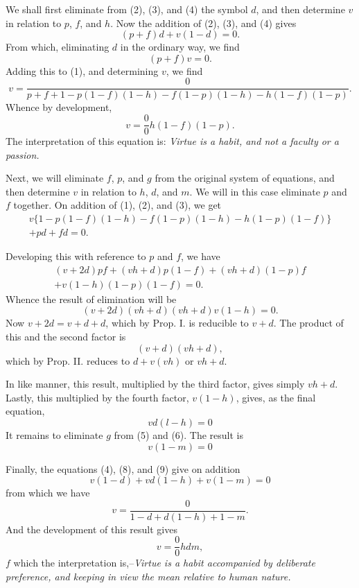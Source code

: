 \documentclass[oneside]{book}
\begin{document}
We shall first eliminate from (2), (3), and (4) the symbol $d$, and
then determine $v$ in relation to $p$, $f$, and $h$. Now the addition of
(2), (3), and (4) gives
\[
\left(p+f\right)d+v\left(1-d\right)=0.
\]
From which, eliminating $d$ in the ordinary way, we find
\begin{equation}
\left(p+f\right)v=0.
\end{equation}
Adding this to (1), and determining $v$, we find
\[
v=\frac{0}{p+f+1-p\left(1-f\right)\left(1-h\right)-f\left(1-p\right)\left(1-h\right)-h\left(1-f\right)\left(1-p\right)}.
\]
Whence by development,
\[
v=\frac{0}{0}h\left(1-f\right)\left(1-p\right).
\]
The interpretation of this equation is: \textit{Virtue is a habit, and not
a faculty or a passion.}

Next, we will eliminate $f$, $p$, and $g$ from the original system
of equations, and then determine $v$ in relation to $h$, $d$, and $m$.
We will in this case eliminate $p$ and $f$ together. On addition of
(1), (2), and (3), we get
\begin{eqnarray*}
v\{1-p(1-f)(1-h)-f(1-p)(1-h)-h(1-p)(1-f)\} \\
                       +pd+fd=0.
\end{eqnarray*}

Developing this with reference to $p$ and $f$, we have
\begin{eqnarray*}
(v+2d)pf+(vh+d)p(1-f)+(vh+d)(1-p)f\\
                       +v(1-h)(1-p)(1-f)=0.
\end{eqnarray*}
Whence the result of elimination will be
\[
(v+2d)(vh+d)(vh+d)v(1-h)=0.
\]
Now $v+2d=v+d+d$, which by Prop. I. is reducible to $v + d$.
The product of this and the second factor is
\[
(v+ d)(vh+d),
\]
which by Prop. II. reduces to
$d+v(vh)$ or $vh+d$.

In like manner, this result, multiplied by the third factor, gives
simply $vh+d$. Lastly, this multiplied by the fourth factor,
$v(1-h)$, gives, as the final equation,
\begin{equation}
vd(l-h)=0
\end{equation}
It remains to eliminate $g$ from (5) and (6). The result is
\begin{equation}
v(1-m)=0
\end{equation}

Finally, the equations (4), (8), and (9) give on addition
\[
v(1-d)+vd(1-h)+v(1-m)=0
\]
from which we have
\[
v=\frac{0}{1-d+d(1-h)+1-m}.
\]
And the development of this result gives
\[
v=\frac{0}{0}hdm,
\]
$f$ which the interpretation is,--\textit{Virtue is a habit accompanied by
deliberate preference, and keeping in view the mean relative to
human nature.}
\end{document}
